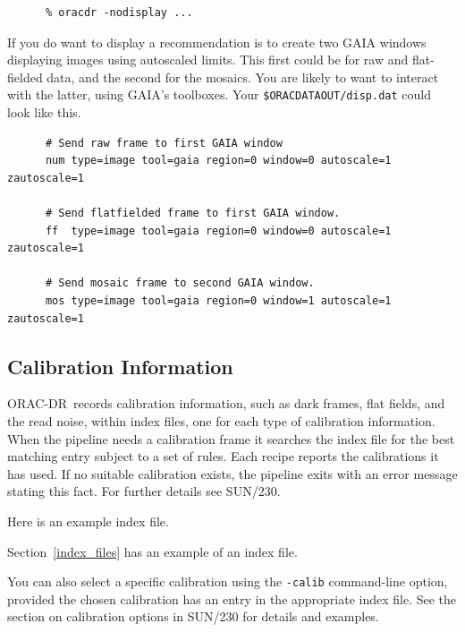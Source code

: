\documentclass[twoside,11pt]{article}
\newcommand{\htmlref}[2]{#1}
\newenvironment{latexonly}{}{}
\newcommand{\xref}[3]{#1}
\newcommand{\xlabel}[1]{}
\renewcommand{\_}{\texttt{\symbol{95}}}
\newcommand{\GAIA}{{\footnotesize GAIA}}
\newcommand{\ORACDR}{{\footnotesize ORAC-DR}}
\begin{document}
\begin{verbatim}
      % oracdr -nodisplay ...
\end{verbatim}

If you do want to display a recommendation is to create two GAIA windows
displaying images using autoscaled limits.  This first could be for
raw and flat-fielded data, and the second for the mosaics.  You are
likely to want to interact with the latter, using \GAIA's toolboxes.
Your {\tt \$ORAC\_DATA\_OUT/disp.dat} could look like this.

\begin{verbatim}
      # Send raw frame to first GAIA window 
      num type=image tool=gaia region=0 window=0 autoscale=1 zautoscale=1

      # Send flatfielded frame to first GAIA window.
      ff  type=image tool=gaia region=0 window=0 autoscale=1 zautoscale=1

      # Send mosaic frame to second GAIA window.
      mos type=image tool=gaia region=0 window=1 autoscale=1 zautoscale=1
\end{verbatim}

\subsection{\xlabel{calibration_information}Calibration Information\label{calibration_information}}

\ORACDR\ records calibration information, such as dark frames, flat
fields, and the read noise, within index files, one for each type of
calibration information.  When the pipeline needs a calibration frame
it searches the index file for the best matching entry subject to a
set of rules. Each recipe reports the calibrations it has used.  If no
suitable calibration exists, the pipeline exits with an error message
stating this fact.  For further details see
\xref{SUN/230}{sun230}{calibration_selection}.
\begin{htmlonly}
Here is an 
\htmlref{example index file.}{index_files}
\end{htmlonly}
\begin{latexonly}
Section~\ref{index_files} has an example of an index file.
\end{latexonly}

You can also select a specific calibration using the {\tt -calib}
command-line option, provided the chosen calibration has an entry
in the appropriate index file.  See
\begin{latexonly}
the section on
\end{latexonly}
\xref{calibration options}{sun230}{calibration_options}
\begin{latexonly}
in SUN/230
\end{latexonly}
for details and examples.
\end{document}
